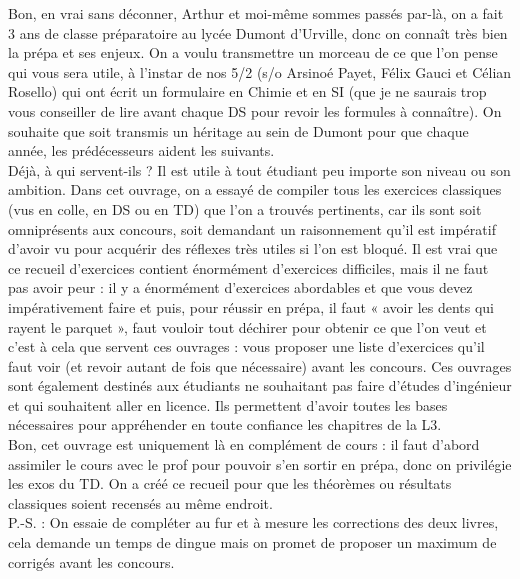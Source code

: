 \documentclass[8pt]{book}
\begin{document}
Bon, en vrai sans déconner, Arthur et moi-même sommes passés par-là, on a fait 3 ans de classe préparatoire au lycée Dumont d’Urville, donc on connaît très bien la prépa et ses enjeux. On a voulu transmettre un morceau de ce que l’on pense qui vous sera utile, à l’instar de nos 5/2 (s/o Arsinoé Payet, Félix Gauci et Célian Rosello) qui ont écrit un formulaire en Chimie et en SI (que je ne saurais trop vous conseiller de lire avant chaque DS pour revoir les formules à connaître). On souhaite que soit transmis un héritage au sein de Dumont pour que chaque année, les prédécesseurs aident les suivants.\\

Déjà, à qui servent-ils ? Il est utile à tout étudiant peu importe son niveau ou son ambition. Dans cet ouvrage, on a essayé de compiler tous les exercices classiques (vus en colle, en DS ou en TD) que l’on a trouvés pertinents, car ils sont soit omniprésents aux concours, soit demandant un raisonnement qu’il est impératif d’avoir vu pour acquérir des réflexes très utiles si l’on est bloqué. Il est vrai que ce recueil d’exercices contient énormément d’exercices difficiles, mais il ne faut pas avoir peur : il y a énormément d’exercices abordables et que vous devez impérativement faire et puis, pour réussir en prépa, il faut « avoir les dents qui rayent le parquet », faut vouloir tout déchirer pour obtenir ce que l’on veut et c’est à cela que servent ces ouvrages : vous proposer une liste d’exercices qu'il faut voir (et revoir autant de fois que nécessaire) avant les concours. Ces ouvrages sont également destinés aux étudiants ne souhaitant pas faire d’études d’ingénieur et qui souhaitent aller en licence. Ils permettent d’avoir toutes les bases nécessaires pour appréhender en toute confiance les chapitres de la L3.\\

Bon, cet ouvrage est uniquement là en complément de cours : il faut d’abord assimiler le cours avec le prof pour pouvoir s’en sortir en prépa, donc on privilégie les exos du TD. On a créé ce recueil pour que les théorèmes ou résultats classiques soient recensés au même endroit.\\

P.-S. : On essaie de compléter au fur et à mesure les corrections des deux livres, cela demande un temps de dingue mais on promet de proposer un maximum de corrigés avant les concours.\\
\end{document}
